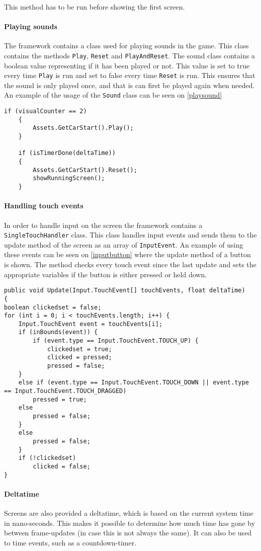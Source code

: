 This method has to be run before showing the first screen.

\paragraph{Playing sounds}
The framework contains a class used for playing sounds in the game. 
This class contains the methods \lstinline|Play|, \lstinline|Reset| and \lstinline|PlayAndReset|.
The sound class contains a boolean value representing if it has been played or not. 
This value is set to true every time \lstinline|Play| is run and set to false every time \lstinline|Reset| is run.
This ensures that the sound is only played once, and that is can first be played again when needed.
An example of the usage of the \lstinline|Sound| class can be seen on \cref{playsound}

\begin{lstlisting}[caption=Playing a sound, label=playsound]
	if (visualCounter == 2) 
	{
		Assets.GetCarStart().Play();
	}

	if (isTimerDone(deltaTime)) 
	{
		Assets.GetCarStart().Reset();
		showRunningScreen();
	}
\end{lstlisting}

\paragraph{Handling touch events}
In order to handle input on the screen the framework contains a \lstinline|SingleTouchHandler| class.
This class handles input events and sends them to the update method of the screen as an array of \lstinline|InputEvent|.
An example of using these events can be seen on \cref{inputbutton} where the update method of a button is shown. 
The method checks every touch event since the last update and sets the appropriate variables if the button is either pressed or held down.

\begin{lstlisting}[caption=Implementation of an ingame button, label=inputbutton]
public void Update(Input.TouchEvent[] touchEvents, float deltaTime) 
{
boolean clickedset = false;
for (int i = 0; i < touchEvents.length; i++) {
	Input.TouchEvent event = touchEvents[i];
	if (inBounds(event)) {
		if (event.type == Input.TouchEvent.TOUCH_UP) {
			clickedset = true;
			clicked = pressed;
			pressed = false;
	}
	else if (event.type == Input.TouchEvent.TOUCH_DOWN || event.type == Input.TouchEvent.TOUCH_DRAGGED)
		pressed = true;
	else
		pressed = false;
	} 
	else
		pressed = false;
	}
	if (!clickedset)
		clicked = false;
}
\end{lstlisting}

\paragraph{Deltatime}
Screens are also provided a deltatime, which is based on the current system time in nano-seconds.
This makes it possible to determine how much time has gone by between frame-updates (in case this is not always the same).
It can also be used to time events, such as a countdown-timer.